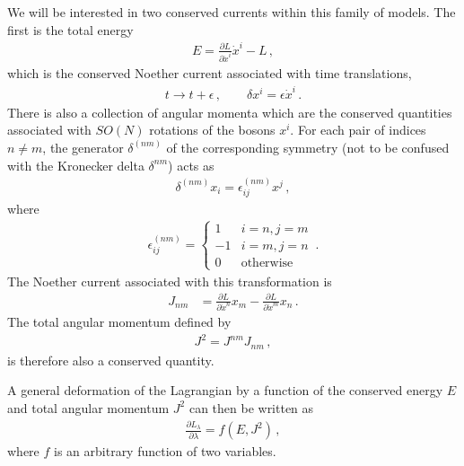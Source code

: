 \documentclass[12pt]{article}
\numberwithin{equation}{section}
\begin{document}
We will be interested in two conserved currents within this family of models. The first is the total energy
%
\begin{align}
    E = \frac{\partial L}{\partial \dot{x}^i} \dot{x}^i - L \, , 
\end{align}
%
which is the conserved Noether current associated with time translations,
%
\begin{align}
    t \to t + \epsilon \, , \qquad \delta x^i = \epsilon \dot{x}^i \, .
\end{align}
%
There is also a collection of angular momenta which are the conserved quantities associated with $SO(N)$ rotations of the bosons $x^i$. For each pair of indices $n \neq m$, the generator $\delta^{(nm)}$ of the corresponding symmetry (not to be confused with the Kronecker delta $\delta^{nm}$) acts as
%
\begin{align}
    \delta^{(nm)} x_i = \epsilon_{ij}^{(nm)} x^j \, , 
\end{align}
%
where 
%
\begin{align}\label{epsilon_defn}
    \epsilon_{ij}^{(nm)} = \begin{cases} 
      1 & i = n , j = m \\
      - 1 & i = m , j = n  \\
      0 & \text{otherwise}  
   \end{cases} \, .
\end{align}
%
The Noether current associated with this transformation is
%
\begin{align}
    J_{nm} &= \frac{\partial L}{\partial \dot{x}^n} x_m - \frac{\partial L}{\partial \dot{x}^m} x_n \, .
\end{align}
%
The total angular momentum defined by
%
\begin{align}
    J^2 = J^{nm} J_{nm} \, ,
\end{align}
%
is therefore also a conserved quantity.

A general deformation of the Lagrangian by a function of the conserved energy $E$ and total angular momentum $J^2$ can then be written as
%
\begin{align}\label{general_f_H_Jsq}
    \frac{\partial L_\lambda}{\partial \lambda} = f \left( E , J^2 \right) \, , 
\end{align}
%
where $f$ is an arbitrary function of two variables.
\end{document}
